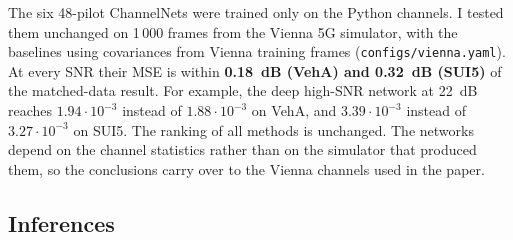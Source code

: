 \documentclass[10pt,a4paper]{article}
\newcommand{\code}[1]{\texttt{\small #1}}
\begin{document}
The six 48-pilot ChannelNets were trained only on the Python channels. I tested them unchanged on 1\,000
frames from the Vienna 5G simulator, with the baselines using covariances from Vienna training frames
(\code{configs/vienna.yaml}). At every SNR their MSE is within \textbf{0.18~dB (VehA) and 0.32~dB
(SUI5)} of the matched-data result. For example, the deep high-SNR network at 22~dB reaches
$1.94\cdot10^{-3}$ instead of $1.88\cdot10^{-3}$ on VehA, and $3.39\cdot10^{-3}$ instead of
$3.27\cdot10^{-3}$ on SUI5. The ranking of all methods is unchanged. The networks depend on the channel
statistics rather than on the simulator that produced them, so the conclusions carry over to the
Vienna channels used in the paper.

\subsection{Inferences}
\end{document}
